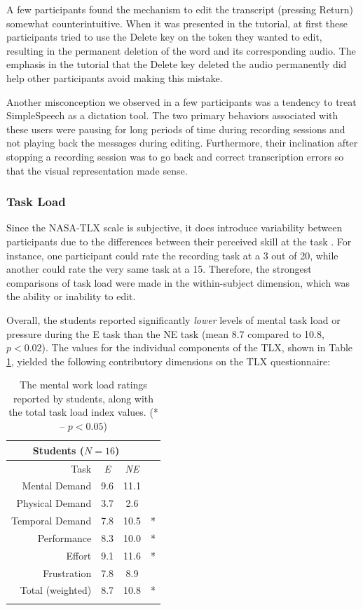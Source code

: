 A few participants found the mechanism to edit the transcript (pressing Return) somewhat counterintuitive. 
When it was presented in the tutorial, at first these participants tried to use the Delete key on the token they wanted to edit, resulting in the permanent deletion of the word and its corresponding audio. 
The emphasis in the tutorial that the Delete key deleted the audio permanently did help other participants avoid making this mistake.

Another misconception we observed in a few participants was a tendency to treat SimpleSpeech as a dictation tool. 
The two primary behaviors associated with these users were pausing for long periods of time during recording sessions and not playing back the messages during editing. 
Furthermore, their inclination after stopping a recording session was to go back and correct transcription errors so that the visual representation made sense.

\subsubsection{Task Load}
Since the NASA-TLX scale is subjective, it does introduce variability between participants due to the differences between their perceived skill at the task \cite{nasatlx}. 
For instance, one participant could rate the recording task at a 3 out of 20, while another could rate the very same task at a 15.
Therefore, the strongest comparisons of task load were made in the within-subject dimension, which was the ability or inability to edit.

Overall, the students reported significantly \emph{lower} levels of mental task load or pressure during the E task than the NE task (mean 8.7 compared to 10.8, $p<0.02$). 
The values for the individual components of the TLX, shown in Table \ref{tab:table1}, yielded the following contributory dimensions on the TLX questionnaire:

\begin{table}
	\centering
	\begin{tabular}{r c c c}
		\multicolumn{3}{c}{\textbf{Students} ($N=16$)} & \\
		\toprule
		Task			& \textit{E} & \textit{NE} & \\
		Mental Demand   & 9.6      & 11.1 		   & \\
		Physical Demand & 3.7      & 2.6           & \\
		Temporal Demand & 7.8      & 10.5          & * \\
		Performance     & 8.3      & 10.0          & * \\
		Effort          & 9.1      & 11.6          & * \\
		Frustration     & 7.8      & 8.9           & \\
		\midrule
		Total (weighted)& 8.7 & 10.8 & * \\
		\bottomrule \\
	\end{tabular}
	\caption{The mental work load ratings reported by students, along with the total task load index values. (* -- $p<0.05$)}~\label{tab:table1}
\end{table}

